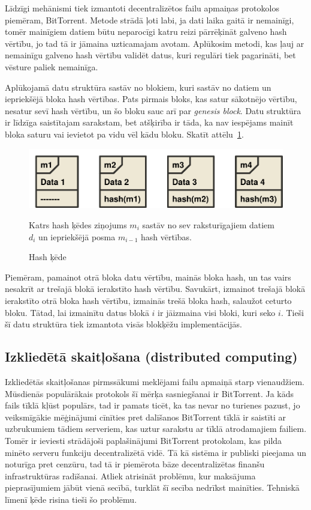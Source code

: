 Līdzīgi mehānismi tiek izmantoti decentralizētos failu apmaiņas protokolos piemēram, BitTorrent. Metode strādā ļoti labi, ja dati laika gaitā ir nemainīgi, tomēr mainīgiem datiem būtu neparocīgi katru reizi pārrēķināt galveno hash vērtību, jo tad tā ir jāmaina uzticamajam avotam. Aplūkosim metodi, kas ļauj ar nemainīgu galveno hash vērtību validēt datus, kuri regulāri tiek pagarināti, bet vēsture paliek nemainīga.

Aplūkojamā datu struktūra sastāv no blokiem, kuri sastāv no datiem un iepriekšējā bloka hash vērtības.\cite{nakamoto08} Pats pirmais bloks, kas satur sākotnējo vērtību, nesatur sevī hash vērtību, un šo bloku sauc arī par \textit{genesis block}. 
Datu struktūra ir līdzīga saistītajam sarakstam, bet atšķirība ir tāda, ka nav iespējams mainīt bloka saturu vai ievietot pa vidu vēl kādu bloku. Skatīt attēlu~\ref{fig:hash-chain}.


\begin{figure}[htpb]
    \centering
    \includegraphics[scale=0.5]{teorija/hash-chain.pdf}
    \caption{Hash ķēde}
    Katrs hash ķēdes ziņojums $m_i$ sastāv no sev raksturīgajiem datiem $d_i$ un
    iepriekšējā posma $m_{i-1}$ hash vērtības.
\label{fig:hash-chain}
\end{figure}

Piemēram, pamainot otrā bloka datu vērtību, mainās bloka hash, un tas vairs nesakrīt ar trešajā blokā ierakstīto hash vērtību. Savukārt, izmainot trešajā blokā ierakstīto otrā bloka hash vērtību, izmainās trešā bloka hash, salaužot ceturto bloku. Tātad, lai izmainītu datus blokā $i$ ir jāizmaina visi bloki, kuri seko $i$. Tieši šī datu struktūra tiek izmantota visās blokķēžu implementācijās.

\subsection{Izkliedētā skaitļošana (distributed computing)}
Izkliedētās skaitļošanas pirmssākumi meklējami failu apmaiņā starp vienaudžiem. Mūsdienās populārākais protokols šī mērķa sasniegšanai ir BitTorrent. Ja kāds fails tīklā kļūst populārs, tad ir pamats ticēt, ka tas nevar no turienes pazust, jo veiksmīgākie mēģinājumi cīnīties pret dalīšanos BitTorrent tīklā ir saistīti ar uzbrukumiem tādiem serveriem, kas uztur sarakstu ar tīklā atrodamajiem failiem. Tomēr ir ieviesti strādājoši paplašinājumi BitTorrent protokolam, kas pilda minēto serveru funkciju decentralizētā vidē.\cite{pouwelse08} Tā kā sistēma ir publiski pieejama un noturīga pret cenzūru, tad tā ir piemērota bāze decentralizētas finanšu infrastruktūras radīšanai. Atliek atrisināt problēmu, kur maksājuma pieprasījumiem jābūt vienā secībā, turklāt šī secība nedrīkst mainīties. Tehniskā līmenī ķēde risina tieši šo problēmu.


